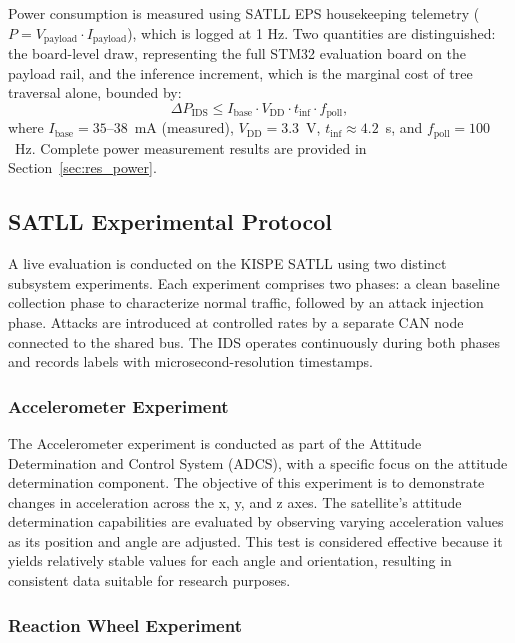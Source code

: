 Power consumption is measured using SATLL EPS housekeeping telemetry ($P = V_{\text{payload}} \cdot I_{\text{payload}}$), which is logged at 1 Hz. Two quantities are distinguished: the board-level draw, representing the full STM32 evaluation board on the payload rail, and the inference increment, which is the marginal cost of tree traversal alone, bounded by:
\[
    \Delta P_{\text{IDS}} \leq I_{\text{base}} \cdot V_{\text{DD}} \cdot t_{\text{inf}} \cdot f_{\text{poll}},
\]
where $I_{\text{base}}=35$--$38$~mA (measured), $V_{\text{DD}}=3.3$~V, $t_{\text{inf}} \approx 4.2$~\textmu s, and $f_{\text{poll}}=100$~Hz. Complete power measurement results are provided in Section~\ref{sec:res_power}.

\subsection{SATLL Experimental Protocol}
\label{sec:experiments}

A live evaluation is conducted on the KISPE SATLL using two distinct subsystem experiments. Each experiment comprises two phases: a clean baseline collection phase to characterize normal traffic, followed by an attack injection phase. Attacks are introduced at controlled rates by a separate CAN node connected to the shared bus. The IDS operates continuously during both phases and records labels with microsecond-resolution timestamps.

\subsubsection{Accelerometer Experiment}

The Accelerometer experiment is conducted as part of the Attitude Determination and Control System (ADCS), with a specific focus on the attitude determination component. The objective of this experiment is to demonstrate changes in acceleration across the x, y, and z axes. The satellite's attitude determination capabilities are evaluated by observing varying acceleration values as its position and angle are adjusted. This test is considered effective because it yields relatively stable values for each angle and orientation, resulting in consistent data suitable for research purposes.


\subsubsection{Reaction Wheel Experiment}

